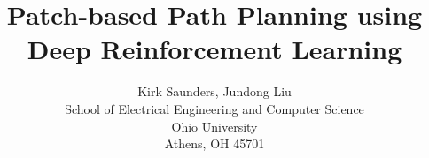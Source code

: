 \title{Patch-based Path Planning using Deep Reinforcement Learning}
\author{Kirk Saunders, Jundong Liu \\
        School of Electrical Engineering and Computer Science \\
        Ohio University \\
        Athens, OH 45701}
\date{}

\maketitle